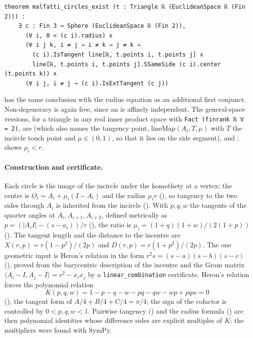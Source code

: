 \documentclass[11pt]{article}
\theoremstyle{definition}
\theoremstyle{remark}
\newcommand{\lean}[1]{\texttt{#1}}
\begin{document}
\begin{lstlisting}
theorem malfatti_circles_exist (t : Triangle ℝ (EuclideanSpace ℝ (Fin 2))) :
    ∃ c : Fin 3 → Sphere (EuclideanSpace ℝ (Fin 2)),
      (∀ i, 0 < (c i).radius) ∧
      (∀ i j k, i ≠ j → i ≠ k → j ≠ k →
        (c i).IsTangent line[ℝ, t.points i, t.points j] ∧
        line[ℝ, t.points i, t.points j].SSameSide (c i).center (t.points k)) ∧
      (∀ i j, i ≠ j → (c i).IsExtTangent (c j))
\end{lstlisting}
 has the same conclusion with the radius equation as an
additional first conjunct. Non-degeneracy is again free, since an  is
affinely independent. The general-space versions, for a triangle in any real inner product space
with \lean{Fact (finrank ℝ V = 2)}, are  (which also
names the tangency point, $\mathrm{lineMap}(A_i,T,\mu)$ with $T$ the incircle touch point and
$\mu\in(0,1)$, so that it lies on the side segment), 
and ; 
shows $\rho_i<r$.

\paragraph{Construction and certificate.} Each circle is the image of the incircle under the
homothety at a vertex: the centre is $O_i=A_i+\mu_i(I-A_i)$ and the radius $\mu_i r$
(), so tangency to the two sides through $A_i$ is inherited from the
incircle (). With $p,q,w$ the tangents of the quarter angles at
$A_i,A_{i+1},A_{i+2}$, defined metrically as $p=(|A_iI|-(s-a_i))/r$ (), the
ratio is $\mu_i=(1+q)(1+w)/(2(1+p))$ (). The tangent length and the distance
to the incentre are $X(r,p)=r(1-p^2)/(2p)$ and $D(r,p)=r(1+p^2)/(2p)$. The one geometric input
is Heron's relation in the form $r^2s=(s-a)(s-b)(s-c)$ (), proved from the
barycentric description of the incentre and the Gram matrix
$\langle A_i-I,A_j-I\rangle=r^2-x_ix_j$ by a \lean{linear\_combination} certificate. Heron's
relation forces the polynomial relation
\[
K(p,q,w)=1-p-q-w-pq-qw-wp+pqw=0
\]
(), the tangent form of $A/4+B/4+C/4=\pi/4$; the sign of the
cofactor is controlled by $0<p,q,w<1$. Pairwise tangency () and the
radius formula () are then polynomial identities whose difference sides
are explicit multiples of $K$; the multipliers were found with SymPy.
\end{document}
